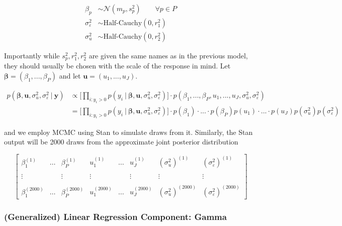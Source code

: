 \documentclass[12pt,twoside]{reedthesis}
\begin{document}
\[
\begin{aligned}
\beta_p &\sim \mathcal{N}(m_p, s_p^2)  \qquad \forall p\in P \\
\sigma_{\varepsilon}^2 &\sim \text{Half-Cauchy}(0, r_1^2) \\
\sigma_{u}^2 &\sim \text{Half-Cauchy}(0, r_2^2)
\end{aligned}
\]

Importantly while \(s_p^2, r_1^2, r_2^2\) are given the same names as in the previous model, they should usually be chosen with the scale of the response in mind. Let \(\boldsymbol{\beta} = (\beta_1, ..., \beta_P)\) and let \(\mathbf{u} = (u_1, ..., u_J)\).

\[
\begin{aligned}
p(\boldsymbol{\beta}, \boldsymbol{u}, \sigma_{u}^2, \sigma_{\varepsilon}^2 \ | \ \mathbf{y}) &\propto \bigg[\prod_{i:y_{i} > 0}p(y_{i} \ | \ \boldsymbol{\beta}, \mathbf{u}, \sigma_{u}^2, \sigma_{\varepsilon}^2)\bigg]\cdot p(\beta_1, ..., \beta_P, u_1, ..., u_J, \sigma_{u}^2, \sigma_{\varepsilon}^2) \\
 &=\bigg[\prod_{i:y_{i} > 0}p(y_{i} \ | \ \boldsymbol{\beta}, \mathbf{u},\sigma_{u}^2, \sigma_{\varepsilon}^2)\bigg]\cdot p(\beta_1)\cdot...\cdot p(\beta_P)p(u_1)\cdot ... \cdot p(u_J)p(\sigma_{u}^2)p( \sigma_{\varepsilon}^2) 
\end{aligned}
\]

and we employ MCMC using Stan to simulate draws from it. Similarly, the Stan output will be 2000 draws from the approximate joint posterior distribution

\[
\begin{bmatrix}
  \beta_1^{(1)} & \dots & \beta_P^{(1)} & u_1^{(1)} & \dots & u_J^{(1)} & (\sigma_{u}^2)^{(1)} & (\sigma_{\varepsilon}^2)^{(1)} \\
  \\ \vdots &  & \vdots & \vdots & & \vdots & \vdots & \vdots \\ \\
  \beta_1^{(2000)} & \dots & \beta_P^{(2000)} & u_1^{(2000)} & \dots & u_J^{(2000)} & (\sigma_{u}^2)^{(2000)} & (\sigma_{\varepsilon}^2)^{(2000)}
\end{bmatrix}
\]

\hypertarget{generalized-linear-regression-component-gamma}{%
\subsubsection{(Generalized) Linear Regression Component: Gamma}\label{generalized-linear-regression-component-gamma}}
\end{document}

